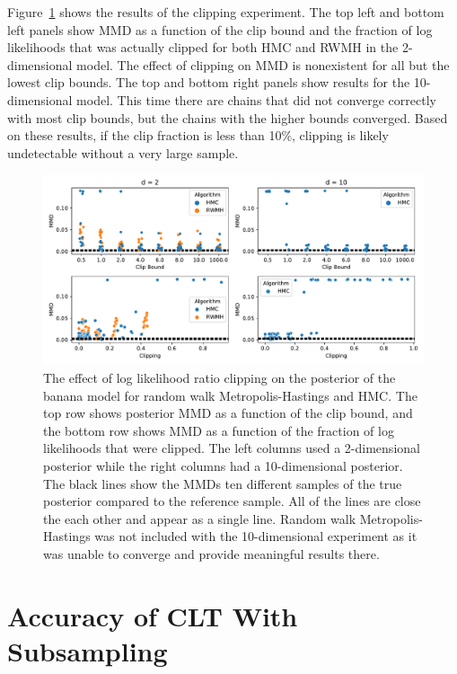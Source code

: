 \documentclass[english,twoside,openright]{HYgraduMLDS}
\begin{document}
Figure~\ref{clip_effect_fig} shows the results of the clipping experiment.
The top left and bottom left panels show MMD as a function of the clip bound 
and the fraction of log likelihoods that was actually clipped for both 
HMC and RWMH in the 2-dimensional model. The effect of clipping on MMD 
is nonexistent for all but the lowest clip bounds. The top and bottom right 
panels show results for the 10-dimensional model. This time there are chains 
that did not converge correctly with most clip bounds, but the chains with 
the higher bounds converged. Based on these results, if the clip fraction is 
less than 10\%, clipping is likely undetectable without a very large sample.

\begin{figure}[h]
    \centering
    \includegraphics[width=\textwidth]{figures/clipping.pdf}
    \caption{
        The effect of log likelihood ratio clipping on the posterior of the 
        banana model for random walk Metropolis-Hastings and HMC.
        The top row shows posterior MMD as a function of the clip bound, and 
        the bottom row shows MMD as a function of the fraction of log likelihoods 
        that were clipped. The left columns used a 2-dimensional posterior 
        while the right columns had a 10-dimensional posterior. 
        The black lines show the MMDs ten different samples of the true posterior
        compared to the reference sample. All of the lines are close the each 
        other and appear as a single line.
        Random walk 
        Metropolis-Hastings was not included with the 10-dimensional experiment 
        as it was unable to converge and provide meaningful results there.
    }
    \label{clip_effect_fig}
\end{figure}
\section{Accuracy of CLT With Subsampling}
\end{document}
